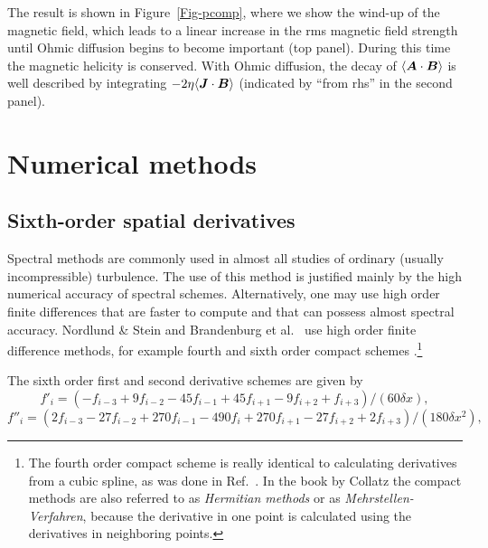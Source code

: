 \documentclass[\mydriver,12pt,twoside,notitlepage,a4paper]{article}
\renewcommand{\vec}[1]{\mbox{\boldmath{$#1$}}}
\newcommand{\Av}            {\vec{A}}
\newcommand{\Bv}            {\vec{B}}
\newcommand{\Jv}            {\vec{J}}
\begin{document}
The result is shown in Figure~\ref{Fig-pcomp}, where we show the
wind-up of the magnetic field, which leads to a linear increase
in the rms magnetic field strength until Ohmic diffusion begins
to become important (top panel).
During this time the magnetic helicity is conserved.
With Ohmic diffusion, the decay of $\langle\Av\cdot\Bv\rangle$
is well described by integrating $-2\eta\langle\Jv\cdot\Bv\rangle$
(indicated by ``from rhs'' in the second panel).


\section{Numerical methods}

\subsection{Sixth-order spatial derivatives}
\label{S-6th-order}

Spectral methods are commonly used in almost all studies of ordinary
(usually incompressible) turbulence. The use of this method is justified
mainly by the high numerical accuracy of spectral schemes. Alternatively,
one may use high order finite differences that are faster to compute
and that can possess almost spectral accuracy.  Nordlund \& Stein \cite{NS90}
and Brandenburg et al.\ \cite{BNST95} use high order finite difference
methods, for example fourth and sixth order compact schemes
\cite{Lele92}.\footnote{The fourth order compact scheme is really identical to
calculating derivatives from a cubic spline, as was done in Ref.~\cite{NS90}.
In the book by Collatz \cite{Collatz66} the compact methods are also
referred to as {\it Hermitian methods} or as {\it Mehrstellen-Verfahren},
because the derivative in one point is calculated using the derivatives
in neighboring points.}

The sixth order first and second derivative schemes are given by
\begin{equation}
f'_i=(-f_{i-3}+9f_{i-2}-45f_{i-1}
+45f_{i+1}-9f_{i+2}+f_{i+3})/(60\delta x),
\end{equation}
\begin{equation}
f''_i=(2f_{i-3}-27f_{i-2}+270f_{i-1}-490f_i
+270f_{i+1}-27f_{i+2}+2f_{i+3})/(180\delta x^2),
\end{equation}
\end{document}
